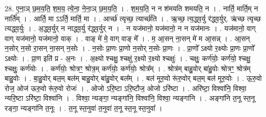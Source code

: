 \documentclass[17pt]{extarticle}
\begin{document}
28. ए॒ना॒ञ् छ॒म॒य॒ति॒ श॒म॒य॒ त्ये॒ना॒ ने॒ना॒ञ् छ॒म॒य॒ति॒ । . श॒म॒य॒ति॒ न न श॑मयति शमयति॒ न । . नार्ति॒ मार्ति॒म् न नार्ति᳚म् । . आर्ति॒ मा ऽऽर्ति॒ मार्ति॒ मा । . आर्च्छ॑ त्यृच्छ॒ त्यार्च्छ॑ति । . ऋ॒च्छ॒ त्य॒द्ध्व॒र्यु र॑द्ध्व॒र्युर्. ऋ॑च्छ त्यृच्छ त्यद्ध्व॒र्युः । . अ॒द्ध्व॒र्युर् न नाद्ध्व॒र्यु र॑द्ध्व॒र्युर् न । . न यज॑मानो॒ यज॑मानो॒ न न यज॑मानः । . यज॑मानो॒ वाग् वाग् यज॑मानो॒ यज॑मानो॒ वाक् । . वाङ् मे॑ मे॒ वाग् वाङ् मे᳚ । . म॒ आ॒सन् ना॒सन् मे॑ म आ॒सन्न् । . आ॒सन् न॒सोर् न॒सो रा॒सन् ना॒सन् न॒सोः । . न॒सोः प्रा॒णः प्रा॒णो न॒सोर् न॒सोः प्रा॒णः । . प्रा॒णो᳚ ऽक्ष्यो र॒क्ष्योः प्रा॒णः प्रा॒णो᳚ ऽक्ष्योः । . प्रा॒ण इति॑ प्र - अ॒नः । . अ॒क्ष्यो श्चक्षु॒ श्चक्षु॑ र॒क्ष्यो र॒क्ष्यो श्चक्षुः॑ । . चक्षुः॒ कर्ण॑योः॒ कर्ण॑यो॒ श्चक्षु॒ श्चक्षुः॒ कर्ण॑योः । . कर्ण॑योः॒ श्रोत्रꣳ॒॒ श्रोत्र॒म् कर्ण॑योः॒ कर्ण॑योः॒ श्रोत्र᳚म् । . श्रोत्र॑म् बाहु॒वोर् बा॑हु॒वोः श्रोत्रꣳ॒॒ श्रोत्र॑म् बाहु॒वोः । . बा॒हु॒वोर् बल॒म् बल॑म् बाहु॒वोर् बा॑हु॒वोर् बल᳚म् । . बल॑ मूरु॒वो रू॑रु॒वोर् बल॒म् बल॑ मूरु॒वोः । . ऊ॒रु॒वो रोज॒ ओज॑ ऊरु॒वो रू॑रु॒वो रोजः॑ । . ओजो ऽरि॒ष्टा ऽरि॒ष्टौज॒ ओजो ऽरि॑ष्टा । . अरि॑ष्टा॒ विश्वा॑नि॒ विश्वा॒ न्यरि॒ष्टा ऽरि॑ष्टा॒ विश्वा॑नि । . विश्वा॒ न्यङ्गा॒ न्यङ्गा॑नि॒ विश्वा॑नि॒ विश्वा॒ न्यङ्गा॑नि । . अङ्गा॑नि त॒नू स्त॒नू रङ्गा॒ न्यङ्गा॑नि त॒नूः । . त॒नू स्त॒नुवा॑ त॒नुवा॑ त॒नू स्त॒नू स्त॒नुवा᳚ । \newline
\end{document}
